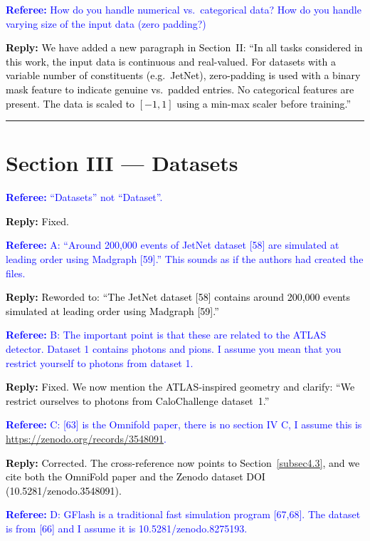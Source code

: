 \documentclass[11pt]{article}
\newcommand{\refcomment}[1]{\textcolor{blue}{\textbf{Referee:} #1}}
\newcommand{\reply}[1]{\textcolor{black}{\textbf{Reply:} #1}}
\begin{document}
\bigskip

\refcomment{How do you handle numerical vs.\ categorical data? How do you handle varying size of the input data (zero padding?)}

\reply{We have added a new paragraph in Section~II: ``In all tasks considered in this work, the input data is continuous and real-valued. For datasets with a variable number of constituents (e.g.\ JetNet), zero-padding is used with a binary mask feature to indicate genuine vs.\ padded entries. No categorical features are present. The data is scaled to $[-1, 1]$ using a min-max scaler before training.''}

\bigskip
\hrule
\bigskip

\section*{Section III --- Datasets}

\refcomment{``Datasets'' not ``Dataset''.}

\reply{Fixed.}

\bigskip

\refcomment{A: ``Around 200,000 events of JetNet dataset [58] are simulated at leading order using Madgraph [59].'' This sounds as if the authors had created the files.}

\reply{Reworded to: ``The JetNet dataset [58] contains around 200,000 events simulated at leading order using Madgraph [59].''}

\bigskip

\refcomment{B: The important point is that these are related to the ATLAS detector. Dataset 1 contains photons and pions. I assume you mean that you restrict yourself to photons from dataset 1.}

\reply{Fixed. We now mention the ATLAS-inspired geometry and clarify: ``We restrict ourselves to photons from CaloChallenge dataset~1.''}

\bigskip

\refcomment{C: [63] is the Omnifold paper, there is no section IV C, I assume this is \url{https://zenodo.org/records/3548091}.}

\reply{Corrected. The cross-reference now points to Section~\ref{subsec4.3}, and we cite both the OmniFold paper and the Zenodo dataset DOI (10.5281/zenodo.3548091).}

\bigskip

\refcomment{D: GFlash is a traditional fast simulation program [67,68]. The dataset is from [66] and I assume it is 10.5281/zenodo.8275193.}
\end{document}
